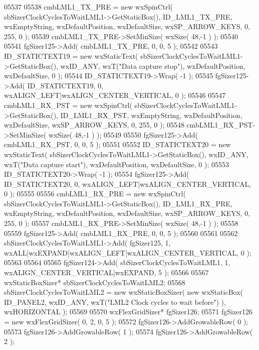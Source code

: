 \begin{DoxyCode}
05537     
05538     cmbLML1_TX_PRE = \textcolor{keyword}{new} wxSpinCtrl( sbSizerClockCyclesToWaitLML1->GetStaticBox(), 
      ID_LML1_TX_PRE, wxEmptyString, wxDefaultPosition, wxDefaultSize, wxSP\_ARROW\_KEYS, 0, 255, 0 );
05539     cmbLML1_TX_PRE->SetMinSize( wxSize( 48,-1 ) );
05540     
05541     fgSizer125->Add( cmbLML1_TX_PRE, 0, 0, 5 );
05542     
05543     ID_STATICTEXT19 = \textcolor{keyword}{new} wxStaticText( sbSizerClockCyclesToWaitLML1->GetStaticBox(), wxID\_ANY, wxT(\textcolor{stringliteral}{"Data
       capture stop"}), wxDefaultPosition, wxDefaultSize, 0 );
05544     ID_STATICTEXT19->Wrap( -1 );
05545     fgSizer125->Add( ID_STATICTEXT19, 0, wxALIGN\_LEFT|wxALIGN\_CENTER\_VERTICAL, 0 );
05546     
05547     cmbLML1_RX_PST = \textcolor{keyword}{new} wxSpinCtrl( sbSizerClockCyclesToWaitLML1->GetStaticBox(), 
      ID_LML1_RX_PST, wxEmptyString, wxDefaultPosition, wxDefaultSize, wxSP\_ARROW\_KEYS, 0, 255, 0 );
05548     cmbLML1_RX_PST->SetMinSize( wxSize( 48,-1 ) );
05549     
05550     fgSizer125->Add( cmbLML1_RX_PST, 0, 0, 5 );
05551     
05552     ID_STATICTEXT20 = \textcolor{keyword}{new} wxStaticText( sbSizerClockCyclesToWaitLML1->GetStaticBox(), wxID\_ANY, wxT(\textcolor{stringliteral}{"Data
       capture start"}), wxDefaultPosition, wxDefaultSize, 0 );
05553     ID_STATICTEXT20->Wrap( -1 );
05554     fgSizer125->Add( ID_STATICTEXT20, 0, wxALIGN\_LEFT|wxALIGN\_CENTER\_VERTICAL, 0 );
05555     
05556     cmbLML1_RX_PRE = \textcolor{keyword}{new} wxSpinCtrl( sbSizerClockCyclesToWaitLML1->GetStaticBox(), 
      ID_LML1_RX_PRE, wxEmptyString, wxDefaultPosition, wxDefaultSize, wxSP\_ARROW\_KEYS, 0, 255, 0 );
05557     cmbLML1_RX_PRE->SetMinSize( wxSize( 48,-1 ) );
05558     
05559     fgSizer125->Add( cmbLML1_RX_PRE, 0, 0, 5 );
05560     
05561     
05562     sbSizerClockCyclesToWaitLML1->Add( fgSizer125, 1, wxALL|wxEXPAND|wxALIGN\_LEFT|wxALIGN\_CENTER\_VERTICAL, 
      0 );
05563     
05564     
05565     fgSizer124->Add( sbSizerClockCyclesToWaitLML1, 1, wxALIGN\_CENTER\_VERTICAL|wxEXPAND, 5 );
05566     
05567     wxStaticBoxSizer* sbSizerClockCyclesToWaitLML2;
05568     sbSizerClockCyclesToWaitLML2 = \textcolor{keyword}{new} wxStaticBoxSizer( \textcolor{keyword}{new} wxStaticBox( 
      ID_PANEL2, wxID\_ANY, wxT(\textcolor{stringliteral}{"LML2 Clock cycles to wait before"}) ), wxHORIZONTAL );
05569     
05570     wxFlexGridSizer* fgSizer126;
05571     fgSizer126 = \textcolor{keyword}{new} wxFlexGridSizer( 0, 2, 0, 5 );
05572     fgSizer126->AddGrowableRow( 0 );
05573     fgSizer126->AddGrowableRow( 1 );
05574     fgSizer126->AddGrowableRow( 2 );

\end{DoxyCode}
